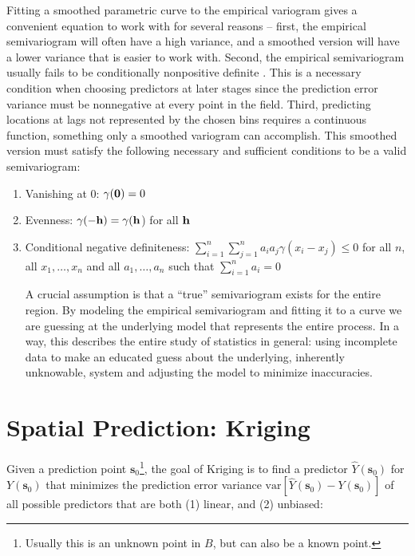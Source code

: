 \documentclass[12pt,twoside]{reedthesis}
\begin{document}
Fitting a smoothed parametric curve to the empirical variogram gives a convenient equation to work with for several reasons -- first, the empirical semivariogram will often have a high variance, and a smoothed version will have a lower variance that is easier to work with. Second, the empirical semivariogram usually fails to be conditionally nonpositive definite \cite{gelfand:2010}. This is a necessary condition when choosing predictors at later stages since the prediction error variance must be nonnegative at every point in the field. Third, predicting locations at lags not represented by the chosen bins requires a continuous function, something only a smoothed variogram can accomplish. This smoothed version must satisfy the following necessary and sufficient conditions to be a valid semivariogram: 

\begin{enumerate}

\item Vanishing at 0: $\gamma(\bold{0}) = 0$
\item Evenness: $\gamma(-\bold{h}) = \gamma(\bold{h}$) for all $\bold{h}$
\item Conditional negative definiteness: $\sum_{i=1}^n \sum_{j=1}^n a_i a_j \gamma(x_i - x_j) \leq 0$ for all $n$, all $x_1, \dots, x_n$ and all $a_1, \dots, a_n$ such that $\sum_{i=1}^n a_i = 0$

A crucial assumption is that a ``true'' semivariogram exists for the entire region. By modeling the empirical semivariogram and fitting it to a curve we are guessing at the underlying model that represents the entire process. In a way, this describes the entire study of statistics in general: using incomplete data to make an educated guess about the underlying, inherently unknowable, system and adjusting the model to minimize inaccuracies.

\end{enumerate}



\section{Spatial Prediction: Kriging}
Given a prediction point $\mathbf{s}_0$\footnote{Usually this is an unknown point in $B$, but can also be a known point.}, the goal of Kriging is to find a predictor $\hat Y(\mathbf{s}_0)$ for $Y(\mathbf{s}_0)$ that minimizes the prediction error variance $\text{var}[\hat Y(\mathbf{s}_0) - Y(\mathbf{s}_0)]$ of all possible predictors that are both (1) linear, and  (2) unbiased:
\end{document}
